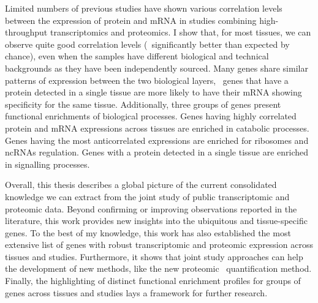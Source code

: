 \begin{singlespace}
{    Limited numbers of previous studies have shown various correlation levels
    between the expression of protein and mRNA
    in studies combining high-throughput transcriptomics and proteomics.
    I show that, for most tissues,
    we can observe quite good correlation levels
    (\ie\ significantly better than expected by chance),
    even when the samples have different biological and technical backgrounds
    as they have been independently sourced.
    Many genes share similar patterns of expression
    between the two biological layers,
    \eg\ genes that have a protein detected in a single tissue
    are more likely to have their mRNA showing specificity for the same tissue.
    Additionally, three groups of genes present functional enrichments
    of biological processes.
    Genes having highly correlated protein and mRNA expressions across tissues
    are enriched in catabolic processes.
    Genes having the most anticorrelated expressions are enriched
    for ribosomes and ncRNAs regulation.
    Genes with a protein detected in a single tissue are enriched
    in signalling processes.\mybr\

    Overall, this thesis describes a global picture
    of the current consolidated knowledge
    we can extract from the joint study
    of public transcriptomic and proteomic data.
    Beyond confirming or improving observations reported in the literature,
    this work provides new insights
    into the ubiquitous and tissue-specific genes.
    To the best of my knowledge,
    this work has also established the most extensive list of genes
    with robust transcriptomic and proteomic expression across tissues and studies.
    Furthermore, it shows that joint study approaches can help the development
    of new methods, like the new proteomic \PPKM\ quantification method.
    Finally, the highlighting of distinct functional enrichment profiles
    for groups of genes across tissues and studies
    lays a framework for further research.\mybr\
    }
\end{singlespace}
